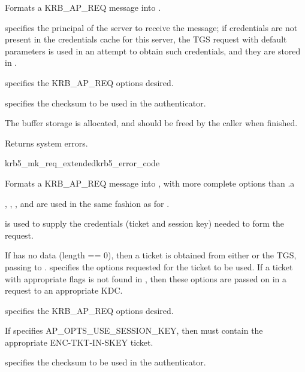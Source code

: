 Formats a KRB_AP_REQ message into .

 specifies the principal of the server to receive the
message; if credentials are not present in the credentials cache
 for this server, the TGS request with default
parameters is used in an attempt to obtain such credentials, and they
are stored in .

 specifies the KRB_AP_REQ options desired.

 specifies the checksum to be used in the authenticator.

The  buffer storage is allocated, and should be freed
by the caller when finished.

Returns system errors.


\begin{funcdecl}{krb5_mk_req_extended}{krb5_error_code}{\funcin}
\funcinout
{}
\funcout
{}
\end{funcdecl}

Formats a KRB_AP_REQ message into , with more complete
options than .a

, , ,
and  are used in the same fashion as for
.

 is used to supply the credentials (ticket and session
key) needed to form the request.

If  has no data (length == 0), then a
ticket is obtained from either  or the TGS, passing
 to . 
 specifies the options requested for the ticket
to be used. If a ticket with appropriate flags is not found in
, then these options are passed on in a request to an
appropriate KDC.

 specifies the KRB_AP_REQ options desired.

If  specifies AP_OPTS_USE_SESSION_KEY, then
 must contain the appropriate
ENC-TKT-IN-SKEY ticket.

 specifies the checksum to be used in the authenticator.

